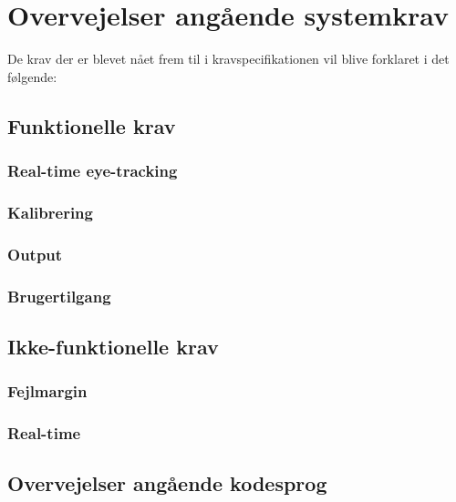 \documentclass[analyse.tex]{subfiles}
\begin{document}
\section{Overvejelser angående systemkrav}
De krav der er blevet nået frem til i kravspecifikationen vil blive forklaret i det følgende:
	
\subsection{Funktionelle krav}


\subsubsection{Real-time eye-tracking}



\subsubsection{Kalibrering}



\subsubsection{Output}



\subsubsection{Brugertilgang}



\subsection{Ikke-funktionelle krav}



\subsubsection{Fejlmargin}



\subsubsection{Real-time}
  


\subsection{Overvejelser angående kodesprog}
\end{document}
